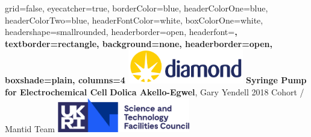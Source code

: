 \documentclass[a0paper,landscape,fontscale=0.32]{baposter}
\begin{document}


\begin{poster}{
	grid=false,
	eyecatcher=true,
	borderColor=blue,
	headerColorOne=blue,
	headerColorTwo=blue,
	headerFontColor=white,
	boxColorOne=white,
	headershape=smallrounded,
	headerborder=open,
	headerfont=\Large\sf\bf,
	textborder=rectangle,
	background=none,
	headerborder=open,
    boxshade=plain,
    columns=4
}
{\includegraphics[height=4em]{images/diamondlogo}}
{\bf \color{blue} Syringe Pump for Electrochemical Cell \vspace{0.5em}} %
{\textbf{Dolica Akello-Egwel}, Gary Yendell \hspace{12pt} 2018 Cohort / Mantid Team} %
{\includegraphics[height=4em]{images/stfclogo}}


\end{poster}
\end{document}
